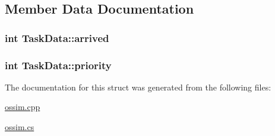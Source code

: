 \subsection{\-Member \-Data \-Documentation}
\hypertarget{struct_task_data_a126fafee3369b6a2d8734f4e46c670bc}{
\subsubsection[{arrived}]{\setlength{\rightskip}{0pt plus 5cm}int {\bf \-Task\-Data\-::arrived}}}\label{struct_task_data_a126fafee3369b6a2d8734f4e46c670bc}
\hypertarget{struct_task_data_a9d8b606897eb428a62d816b71312e1b7}{
\subsubsection[{priority}]{\setlength{\rightskip}{0pt plus 5cm}int {\bf \-Task\-Data\-::priority}}}\label{struct_task_data_a9d8b606897eb428a62d816b71312e1b7}


\-The documentation for this struct was generated from the following files\-:\begin{DoxyCompactItemize}
\item 
\hyperlink{ossim_8cpp}{ossim.\-cpp}\item 
\hyperlink{ossim_8cs}{ossim.\-cs}\end{DoxyCompactItemize}
